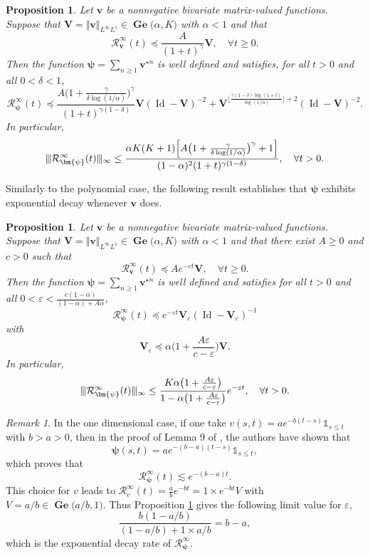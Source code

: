 \documentclass[reqno,final,11pt]{amsart}
\renewcommand{\cite}{\citet}
\theoremstyle{plain}
\newtheorem{proposition}[theorem]{Proposition}
\theoremstyle{definition}
\theoremstyle{remark}
\newtheorem{remark}[theorem]{Remark}
\newcommand{\ind}{\mathds{1}}
\newcommand{\Ge}[2]{\bm{\Gel(} #1,#2 \bm{)} }
\newcommand{\Vityone}[1]{\Vert #1 \Vert_{L^{\infty}L^{1}}}
\newcommand{\Vvert}{\vert \hspace{-1pt} \vert \hspace{-1pt} \vert}
\newcommand{\Res}{\mathcal{R}}
\DeclareMathOperator{\Gel}{Ge}
\DeclareMathOperator{\Id}{Id}
\begin{document}
\begin{proposition}\label{prop4.3}
	Let $\bm{v}$ be a nonnegative bivariate matrix-valued functions. Suppose that $\bm{V} =\Vityone{\bm{v}} \in\Ge{\alpha}{K}$ with $\alpha<1$ and that
	\[\Res_{\bm{v}}^{\infty}(t) \preceq \frac{A}{(1+t)^{\gamma}} \bm{V}, \quad \forall t\geq 0.\]
	Then the function $\bm{\psi} = \sum_{n\geq 1} \bm{v}^{\star n}$ is well defined and satisfies, for all $t> 0$ and all $0<\delta <1$,
	\begin{equation*}
	\Res_{\bm{\psi}}^{\infty}(t) \preceq \frac{A \big(1+\frac{\gamma}{\delta \log(1/\alpha)}\big)^{\gamma}}{(1+t)^{\gamma(1-\delta)}}\bm{V} (\Id-\bm{V})^{-2} + \bm{V}^{\lfloor\frac{\gamma(1-\delta) \log(1+t)}{\log(1/\alpha)}\rfloor+2} (\Id-\bm{V})^{-2}.
	\end{equation*}
	In particular,
	\begin{equation*}
		\Vvert \Res_{\bm{\psi}}^{\infty}(t) \Vvert_{\infty} \leq \frac{\alpha K(K+1) \Big[ A\big(1+\frac{\gamma}{\delta \log(1/\alpha)}\big)^{\gamma} + 1\Big]}{(1-\alpha)^2(1+t)^{\gamma(1-\delta)}}, \quad \forall t>0.
	\end{equation*}
\end{proposition}

Similarly to the polynomial case, the following result establishes that $\bm{\psi}$ exhibits exponential decay whenever $\bm{v}$ does.

\begin{proposition}\label{prop4.4}
	Let $\bm{v}$ be a nonnegative bivariate matrix-valued functions. Suppose that $\bm{V} =\Vityone{\bm{v}} \in\Ge{\alpha}{K}$ with $\alpha<1$ and that there exist $A\geq 0$ and $c>0$ such that
	\[\Res_{\bm{v}}^{\infty}(t) \preceq A e^{-ct} \bm{V}, \quad \forall t\geq 0.\]
	Then the function $\bm{\psi} = \sum_{n\geq 1} \bm{v}^{\star n}$ is well defined and satisfies for all $t>0$ and all $0<\varepsilon< \frac{c(1-\alpha)}{(1-\alpha)+A\alpha}$, \[ \Res_{\bm{\psi}}^{\infty}(t) \preceq  e^{-\varepsilon t} \bm{V}_{\varepsilon}(\Id-\bm{V}_{\varepsilon})^{-1} \] with \[\bm{V}_{\varepsilon} \preceq \alpha \big(1 + \frac{A\varepsilon}{c-\varepsilon}\big) \bm{V}.\] In particular,
	\[\Vvert \Res_{\bm{\psi}}^{\infty}(t) \Vvert_{\infty} \leq \frac{ K \alpha \big(1 + \frac{A\varepsilon}{c-\varepsilon}\big)
	}{1-\alpha \big(1 + \frac{A\varepsilon}{c-\varepsilon}\big)} e^{-\varepsilon t}, \quad \forall t>0.\]
\end{proposition}

\begin{remark}
	In the one dimensional case, if one take $v(s,t) = a e^{-b(t-s)}\ind_{s\leq t}$ with $b>a >0$, then in the proof of Lemma 9 of \cite{tchouanti_separation_2024}, the authors have shown that \[\bm{\psi}(s,t) = a e^{-(b-a)(t-s)}\ind_{s\leq t},\] which proves that \[ \Res_{\bm{\psi}}^{\infty}(t) \lesssim e^{-(b-a)t}.\] This choice for $v$ leads to $\Res_v^{\infty}(t)= \frac{a}{b}e^{-bt}= 1\times e^{-bt} V$ with $V=a/b \in\Ge{a/b}{1}$. Thus Proposition \ref{prop4.4} gives the following limit value for $\varepsilon$, \[\frac{b(1-a/b)}{(1-a/b) + 1\times a/b} = b-a,\]
	which is the exponential decay rate of $\Res_{\bm{\psi}}^{\infty}$.
\end{remark}
\end{document}
